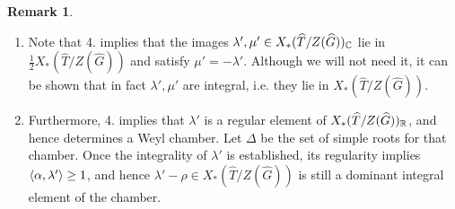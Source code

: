 \documentclass{article}
\theoremstyle{definition}
\newtheorem{rem}[thm]{Remark}
\numberwithin{equation}{section}
\renewcommand{\-}{\hyp{}}
\begin{document}
\begin{rem}
	\begin{enumerate}
		\item Note that 4. implies that the images $\lambda',\mu' \in X_*(\widehat T/Z(\widehat G))_{\mathbb{C}}$ lie in $\tfrac{1}{2}X_*(\hat T/Z(\hat G))$ and satisfy $\mu'=-\lambda'$. Although we will not need it, it can be shown that in fact $\lambda',\mu'$ are integral, i.e. they lie in $X_*(\hat T/Z(\hat G))$.
  		\item Furthermore, 4. implies that $\lambda'$ is a regular element of $X_*(\widehat T/Z(\widehat G))_{\mathbb{R}}$, and hence determines a Weyl chamber. Let $\Delta$ be the set of simple roots for that chamber. Once the integrality of $\lambda'$ is established, its regularity implies $\langle\alpha,\lambda'\rangle \geq 1$, and hence $\lambda'-\rho \in X_*(\hat T/Z(\hat G))$ is still a dominant integral element of the chamber.
	\end{enumerate}

\end{rem}
\end{document}
